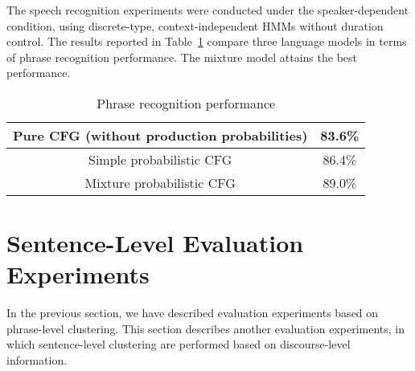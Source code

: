 The speech recognition experiments were conducted
under the speaker-dependent condition,
using discrete-type, context-independent HMMs without duration control.
The results reported in Table~\ref{Tab:Performance}
compare three language models
in terms of phrase recognition performance.
The mixture model attains the best performance.


\begin{table}[h]
\caption{Phrase recognition performance} \label{Tab:Performance}
\begin{center}
\begin{tabular}{c|c}
\hline
Pure CFG (without production probabilities)	&  83.6\% \\ \hline
Simple probabilistic CFG			&  86.4\% \\ \hline
Mixture probabilistic CFG			&  89.0\% \\ \hline
\end{tabular}
\end{center}
\end{table}


\section{Sentence-Level Evaluation Experiments}

In the previous section,
we have described evaluation experiments based on phrase-level clustering.
This section describes another evaluation experiments,
in which sentence-level clustering are performed
based on discourse-level information.

